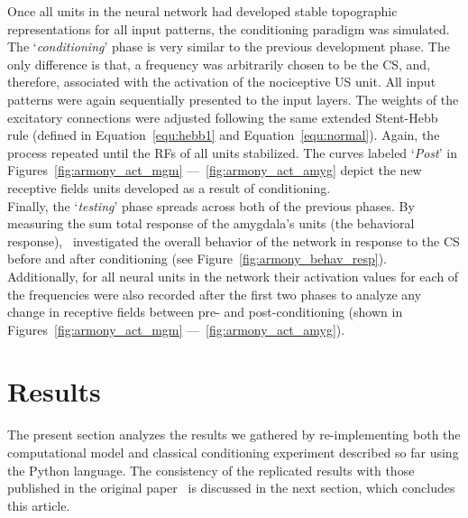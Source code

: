 Once all units in the neural network had developed stable topographic representations for all input patterns, the conditioning paradigm was simulated. The `\emph{conditioning}' phase is very similar to the previous development phase. The only difference is that, a frequency was arbitrarily chosen to be the CS, and, therefore, associated with the activation of the nociceptive US unit. All input patterns were again sequentially presented to the input layers. The weights of the excitatory connections were adjusted following the same extended Stent-Hebb rule (defined in Equation~\ref{equ:hebb1} and Equation~\ref{equ:normal}). Again, the process repeated until the RFs of all units stabilized. The curves labeled `\emph{Post}' in Figures~\ref{fig:armony_act_mgm} ---~\ref{fig:armony_act_amyg} depict the new receptive fields units developed as a result of conditioning.\\

Finally, the `\emph{testing}' phase spreads across both of the previous phases. By measuring the sum total response of the amygdala's units (the behavioral response),~\citet{Armony1995} investigated the overall behavior of the network in response to the CS before and after conditioning (see Figure~\ref{fig:armony_behav_resp}). Additionally, for all neural units in the network their activation values for each of the frequencies  were also recorded after the first two phases to analyze any change in receptive fields between pre- and post-conditioning (shown in Figures~\ref{fig:armony_act_mgm} ---~\ref{fig:armony_act_amyg}).

\section{Results}
The present section analyzes the results we gathered by re-implementing both the computational model and classical conditioning experiment described so far using the Python language. The consistency of the replicated results with those published in the original paper~\supercite{Armony1995} is discussed in the next section, which concludes this article.\\

